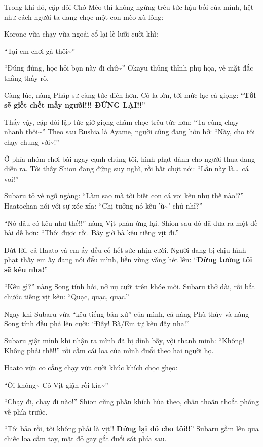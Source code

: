 \documentclass[../main.tex]{subfiles}
\begin{document}
Trong khi đó, cặp đôi Chó-Mèo thì không ngừng trêu tức hậu bối của mình, hệt như cách người ta đang chọc một con mèo xù lông:

Korone vừa chạy vừa ngoái cổ lại lè lưỡi cười khì:

``Tại em chơi gà thôi\~{}''

``Đúng đúng, học hỏi bọn này đi chứ\~{}'' Okayu thủng thỉnh phụ họa, vẻ mặt đắc thắng thấy rõ.

Càng lúc, nàng Pháp sư càng tức điên hơn. Cô la lớn, tới mức lạc cả giọng: ``\textbf{Tôi sẽ giết chết mấy người!!! ĐỨNG LẠI!!}''

Thấy vậy, cặp đôi lập tức giở giọng châm chọc trêu tức hơn: ``Ta cùng chạy nhanh thôi\~{}'' Theo sau Rushia là Ayame, người cũng đang hớn hở: ``Này, cho tôi chạy chung với\~{}!''

Ở phía nhóm chơi bài ngay cạnh chúng tôi, hình phạt dành cho người thua đang diễn ra. Tôi thấy Shion đang đứng suy nghĩ, rồi bất chợt nói: ``Lần này là\dots\ cá voi!''

Subaru tỏ vẻ ngỡ ngàng: ``Làm sao mà tôi biết con cá voi kêu như thế nào!?'' Haatochan nói với sự xóc xỉa: ``Chị tưởng nó kêu 'ù\~{}' chứ nhỉ?''

``Nó đâu có kêu như thế!!'' nàng Vịt phản ứng lại. Shion sau đó đã đưa ra một đề bài dễ hơn: ``Thôi được rồi. Bây giờ bà kêu tiếng vịt đi.''

Dứt lời, cả Haato và em ấy đều cố hết sức nhịn cười. Người đang bị chịu hình phạt thấy em ấy đang nói đểu mình, liền vùng văng hét lên: ``\textbf{Đừng tưởng tôi sẽ kêu nha!}''

``Kêu gì?'' nàng Song tính hỏi, nở nụ cười trên khóe môi. Subaru thở dài, rồi bắt chước tiếng vịt kêu: ``Quạc, quạc, quạc.''

Ngay khi Subaru vừa ``kêu tiếng bản xứ'' của mình, cả nàng Phù thủy và nàng Song tính đều phá lên cười: ``Đấy! Bà/Em tự kêu đấy nha!''

Subaru giật mình khi nhận ra mình đã bị dính bẫy, vội thanh minh: ``Không! Không phải thế!!'' rồi cầm cái loa của mình đuổi theo hai người họ.

Haato vừa co cẳng chạy vừa cười khúc khích chọc ghẹo:

``Ôi không\~{} Cô Vịt giận rồi kìa\~{}''

``Chạy đi, chạy đi nào!'' Shion cũng phấn khích hùa theo, chân thoăn thoắt phóng về phía trước.

``Tôi bảo rồi, tôi không phải là vịt!! \textbf{Đứng lại đó cho tôi!!}'' Subaru gầm lên qua chiếc loa cầm tay, mặt đỏ gay gắt đuổi sát phía sau.
\end{document}
